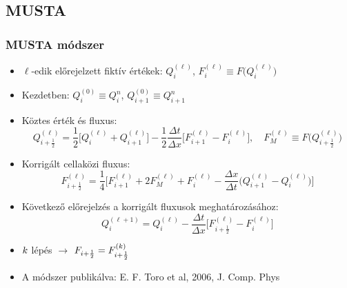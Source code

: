 \documentclass{beamer}
\begin{document}
\subsection{MUSTA}
\begin{frame}
\frametitle{MUSTA módszer}
\begin{itemize}
\item<1-> $\ell$-edik előrejelzett fiktív értékek: $Q^{(\ell)}_{i}$, $F^{(\ell)}_{i}\equiv F\big(Q^{(\ell)}_{i}\big)$
\item<2-> Kezdetben: $Q^{(0)}_i\equiv Q^n_i$,  $Q^{(0)}_{i+1}\equiv Q^{n}_{i+1}$
\item<3-> Köztes érték és fluxus:
\begin{equation*}
Q^{(\ell)}_{i+\frac{1}{2}}=\frac{1}{2}\Big[Q^{(\ell)}_i+Q^{(\ell)}_{i+1}\Big]-\frac{1}{2}\frac{\Delta t}{\Delta x}\Big[F^{(\ell)}_{i+1}-F^{(\ell)}_i\Big], \quad F_M^{(\ell)} \equiv F\big(Q^{(\ell)}_{i+\frac{1}{2}}\big)
\end{equation*}

\item<3-> Korrigált cellaközi fluxus:
\begin{equation*}
F^{(\ell)}_{i+\frac{1}{2}}=\frac{1}{4}\Big[F^{(\ell)}_{i+1}+2F^{(\ell)}_M+F^{(\ell)}_{i}-\frac{\Delta x}{\Delta t}\Big(Q^{(\ell)}_{i+1}-Q^{(\ell)}_i\Big)\Big]
\end{equation*}
\item<4-> Következő előrejelzés a korrigált fluxusok meghatározásához:
\begin{equation*}
Q_i^{(\ell+1)}=Q^{(\ell)}_i-\frac{\Delta t}{\Delta x}\Big[F^{(\ell)}_{i+\frac{1}{2}}-F^{(\ell)}_i\Big]
\end{equation*}
\item<5-> $\mathit\mathbf{{k}}$ lépés $\rightarrow$ $F_{i+\frac{1}{2}}=F_{i+\frac{1}{2}}^{(\mathit\mathbf{{k}})}$
\item<5-> A módszer publikálva: E. F. Toro et al, 2006, J. Comp. Phys
\end{itemize}
\end{frame}
\end{document}
